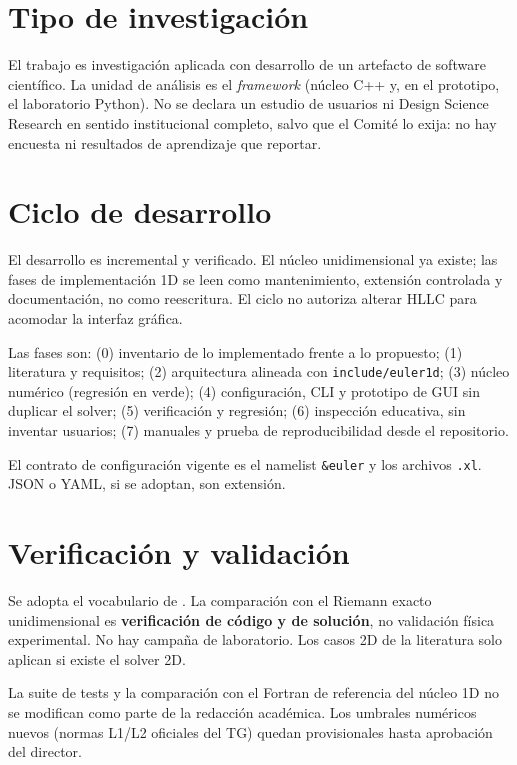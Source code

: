 \section{Tipo de investigación}

El trabajo es investigación aplicada con desarrollo de un artefacto de software científico. La unidad de análisis es el \textit{framework} (núcleo C++ y, en el prototipo, el laboratorio Python). No se declara un estudio de usuarios ni Design Science Research en sentido institucional completo, salvo que el Comité lo exija: no hay encuesta ni resultados de aprendizaje que reportar.

\section{Ciclo de desarrollo}

El desarrollo es incremental y verificado. El núcleo unidimensional ya existe; las fases de implementación 1D se leen como mantenimiento, extensión controlada y documentación, no como reescritura. El ciclo no autoriza alterar HLLC para acomodar la interfaz gráfica.

Las fases son: (0) inventario de lo implementado frente a lo propuesto; (1) literatura y requisitos; (2) arquitectura alineada con \texttt{include/euler1d}; (3) núcleo numérico (regresión en verde); (4) configuración, CLI y prototipo de GUI sin duplicar el solver; (5) verificación y regresión; (6) inspección educativa, sin inventar usuarios; (7) manuales y prueba de reproducibilidad desde el repositorio.

El contrato de configuración vigente es el namelist \texttt{\&euler} y los archivos \texttt{.xl}. JSON o YAML, si se adoptan, son extensión.

\section{Verificación y validación}

Se adopta el vocabulario de \textcite{oberkampf2010}. La comparación con el Riemann exacto unidimensional es \textbf{verificación de código y de solución}, no validación física experimental. No hay campaña de laboratorio. Los casos 2D de la literatura solo aplican si existe el solver 2D.

La suite de tests y la comparación con el Fortran de referencia del núcleo 1D no se modifican como parte de la redacción académica. Los umbrales numéricos nuevos (normas L1/L2 oficiales del TG) quedan provisionales hasta aprobación del director.

